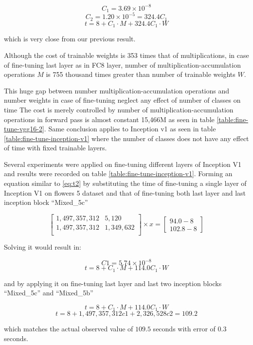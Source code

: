 \[ C_1 = 3.69\times 10^{-8} \]
\[ C_2 = 1.20\times 10 ^{-5} = 324.4 C_1 \]
\[ t = 8 + C_1 \cdot M + 324.4  C_1 \cdot W \]

which is very close from our previous result.

Although the cost of trainable weights is 353 times that of multiplications,
in case of fine-tuning last layer as in FC8 layer,
number of multiplication-accumulation operations \(M\)
is 755 thousand times greater than number of trainable weights \(W\).

This huge gap between number multiplication-accumulation operations 
and number weights in case of fine-tuning neglect any effect of number of classes on time
The cost is merely controlled by number of multiplication-accumulation operations in forward pass is almost constant 15,466M
as seen in table \ref{table:fine-tune-vgg16-2}.
Same conclusion applies to Inception v1 as seen in table \ref{table:fine-tune-inception-v1}
where the number of classes does not have any effect of time with fixed trainable layers.

Several experiments were applied on fine-tuning different layers of Inception V1
and results were recorded on table \ref{table:fine-tune-inception-v1}.
Forming an equation similar to \ref{eq:t2} by substituting the time of fine-tuning a single layer of Inception V1
on flowers 5 dataset and that of fine-tuning both last layer and last inception block ``Mixed\_5c''

\begin{equation}
\begin{bmatrix}
1,497,357,312 &     5,120 \\
1,497,357,312 & 1,349,632 \\
\end{bmatrix}
\times x = 
\begin{bmatrix}
 94.0-8 \\
102.8-8
\end{bmatrix}
\label{eq:t_inception_v1_1}
\end{equation}

Solving it would result in:

\[ C1 = 5.74\times 10^{-8} \]
\[ t = 8 + C_1 \cdot M + 114.0  C_1 \cdot W \]

and by applying it on fine-tuning last layer and last two inception blocks ``Mixed\_5c'' and ``Mixed\_5b''

\[ t = 8 + C_1 \cdot M + 114.0  C_1 \cdot W \]
\[ t = 8 + 1,497,357,312 c1 + 2,326,528 c2 = 109.2 \]

which matches the actual observed value of \( 109.5 \) seconds with error of \(0.3\) seconds.

